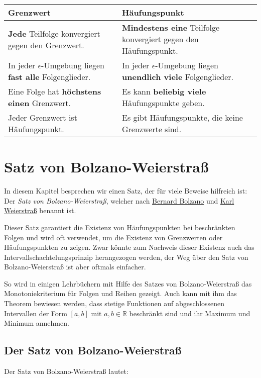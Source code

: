 \documentclass[fontsize=9pt,
               parskip=half-,
               DIV=14,
               listof=chapterentry,
               tocflat]{scrbook}
\begin{document}
\begin{longtabu} to \linewidth {X[l]X[l]} \\ \toprule 
Grenzwert & Häufungspunkt \\ 
\midrule
\textbf{Jede} Teilfolge konvergiert gegen den Grenzwert. & \textbf{Mindestens eine} Teilfolge konvergiert gegen den Häufungspunkt. \\ 
In jeder $\epsilon $-Umgebung liegen \textbf{fast alle} Folgenglieder. & In jeder $\epsilon $-Umgebung liegen \textbf{unendlich viele} Folgenglieder. \\ 
Eine Folge hat \textbf{höchstens einen} Grenzwert. & Es kann \textbf{beliebig viele} Häufungspunkte geben. \\ 
Jeder Grenzwert ist Häufungspunkt. & Es gibt Häufungspunkte, die keine Grenzwerte sind. \\ 
\bottomrule
\end{longtabu}
\renewcommand{\arraystretch}{1.0}

\chapter{Satz von Bolzano-Weierstraß}

In diesem Kapitel besprechen wir einen Satz, der für viele Beweise hilfreich ist: Der \emph{Satz von Bolzano-Weierstraß}, welcher nach \href{https://de.wikipedia.org/wiki/Bernard\%20Bolzano}
{Bernard Bolzano} und \href{https://de.wikipedia.org/wiki/Karl\%20Weierstraß}
{Karl Weierstraß} benannt ist.

Dieser Satz garantiert die Existenz von Häufungspunkten bei beschränkten Folgen und wird oft verwendet, um die Existenz von Grenzwerten oder Häufungspunkten zu zeigen. Zwar könnte zum Nachweis dieser Existenz auch das Intervallschachtelungsprinzip herangezogen werden, der Weg über den Satz von Bolzano-Weierstraß ist aber oftmals einfacher.

So wird in einigen Lehrbüchern mit Hilfe des Satzes von Bolzano-Weierstraß das Monotoniekriterium für Folgen und Reihen gezeigt. Auch kann mit ihm das Theorem bewiesen werden, dass stetige Funktionen auf abgeschlossenen Intervallen der Form $[a,b]$ mit $a,b\in \mathbb {R} $ beschränkt sind und ihr Maximum und Minimum annehmen.

\section{Der Satz von Bolzano-Weierstraß}

Der Satz von Bolzano-Weierstraß lautet:
\end{document}
